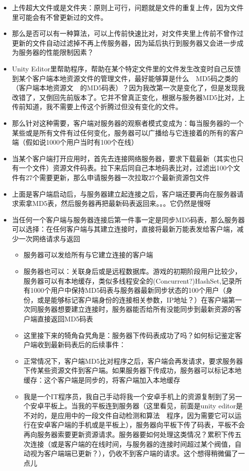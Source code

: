 \documentclass[9pt, b5paper]{article}
\begin{document}
\begin{itemize}
\item 上传超大文件或是文件夹：原则上可行，问题就是文件的重复上传，因为文件里可能会有不曾更新过的文件。
\item 那么是否可以有一种算法，可以上传前快速比对，对文件夹里上传前不曾作过更新的文件自动过滤掉不再上传服务器，因为延后执行到服务器又会进一步成为服务器的性能限制因素？
\item Unity Editor里帮助程序，帮助在某个特定文件里的文件发生改变时自己反馈到某个客户端本地资源文件的管理文件，最好能够算是什么　MD5码之类的（客户端本地资源文　的MD5码表）？因为我改第一次是变化了，但是发现我改错了，又倒回先前版本了。它并不曾真正变化，根据与服务器MD5比对，上传前知道，我不需要上传这个折腾过但没有变化的文件。
\item 那么针对这种需要，客户端对服务器的观察者模式变成为：每当服务器的一个某些或是所有文件有过任何变化，服务器可以广播给与它连接着的所有的客户端（假如说1000个用户当时有100个在线）
\item 当某个客户端打开应用时，首先去连接网络服务器，要求下载最新（其实也只有一个文件）资源文件码表。拉下来后同自己本地码表比对，过滤出100个文件有27个需要更新，那么申请服务器一次拉取27个最新资源包文件
\item 上面是客户端启动后，与服务器建立起连接之后，客户端还要再向在服务器请求索拿MD5表，然后服务器再把最新码表返回来。。。它仍然是慢呀
\item 当任何一个客户端与服务器连接后第一件事一定是同步MD5码表，那么服务器可以选择：在任何客户端与其建立连接时，直接将最新万能表发给客户端，减少一次网络请求与返回
\begin{itemize}
\item 服务器可以发给所有与它建立连接的客户端
\item 服务器也可以：关联身后或是远程数据库。游戏的初期阶段用户比较少，服务器可以有本地缓存，类似多线程安全的(Concurrent?)HashSet,记录所有1000个用户中保持MD5码表与服务器最新同步状态的100个用户（身份，或是能够标记客户端身份的连接相关参数，IP地址？）在客户端第一次同服务器想要建立连接时，服务器能否给所有没能同步到最新资源的客户端直接返回MD5码表
\item 这里接下来的犄角旮旯角是：服务器下传码表成功了吗？如何标记鉴定客户端收到最新码表后的后续事件：
\item 正常情况下，客户端MD5比对程序之后，客户端会再发请求，要求服务器下传某些资源文件到客户端。如果服务器下传成功，服务器可以标记本地缓存：这个客户端是同步的，将客户端加入本地缓存
\item 我是一个IT程序员，我自己手动将我一个安卓手机上的资源复制到了另一个安卓平板上。当我的平板连到服务器（这里看见，前面是unity editor是不对的，是应用中的一段文件自动检测和算法　程序，因为需要它可以运行在安卓客户端的手机或是平板上），服务器向平板下传了码表，平板不会再向服务器索要更新资源请求。服务器要如何处理这类情况？累积下传五次连接（或是客户端的在线时间，与服务器的连接时间超过某个阀值，自动视为客户端端已更新？），仍收不到客户端的请求。这个想得稍微偏了一点儿

\end{itemize}
\end{itemize}
\end{document}
